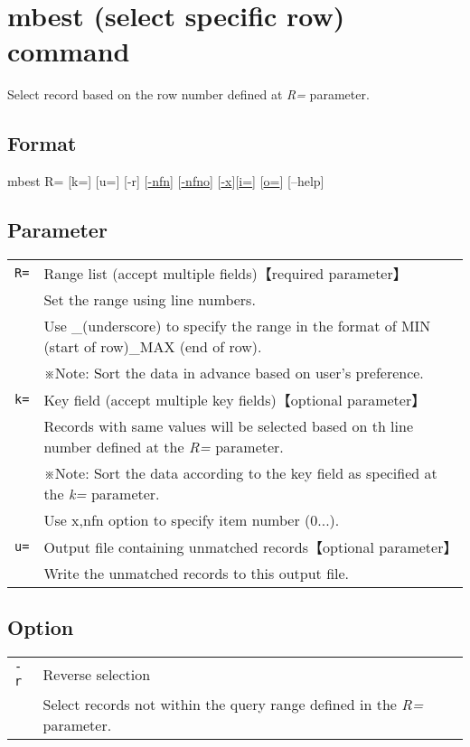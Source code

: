 \documentclass[a4paper]{jarticle}
\begin{document}
\setlength{\baselineskip}{4mm}

\section*{mbest (select specific row) command}
Select record  based on the row number defined at \emph{R=} parameter. 

\subsection*{Format}
mbest R= [k=] [u=] [-r] [\href{run:option.pdf}{-nfn}] [\href{run:option.pdf}{-nfno}]  [\href{run:option.pdf}{-x}][\href{run:option.pdf}{i=}] [\href{run:option.pdf}{o=}] [--help]\\

\subsection*{Parameter}
\begin{table}[htbp]
{\small
\begin{tabular}{ll}
\verb|R=|    & Range list (accept multiple fields)【required parameter】\\
& Set the range using line numbers.\\
& Use \_(underscore) to specify the range in the format of MIN (start of row)\_MAX (end of row).\\
& ※Note: Sort the data in advance based on user's preference.  \\
\verb|k=|    & Key field (accept multiple key fields)【optional parameter】\\
& Records with same values will be selected based on th line number defined at the \emph{R=} parameter. \\
& ※Note: Sort the data according to the key field as specified at the \emph{k=} parameter. \\
& Use x,nfn option to specify item number (0...). \\
\verb|u=|    &  Output file containing unmatched records【optional parameter】\\
& Write the unmatched records to this output file.\\
\end{tabular} 
}
\end{table} 

\subsection*{Option}
\begin{table}[htbp]
{\small
\begin{tabular}{ll}
\verb|-r|  & Reverse selection\\
& Select records not within the query range defined in the \emph{R=} parameter. \\
\end{tabular} 
}
\end{table} 
\end{document}
